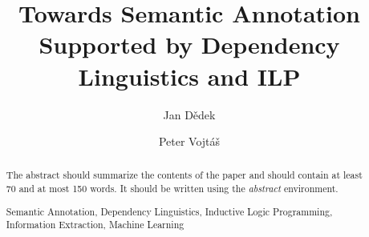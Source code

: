 \documentclass[runningheads,a4paper]{llncs}
\newcommand{\keywords}[1]{\par\addvspace\baselineskip
\noindent\keywordname\enspace\ignorespaces#1}
\begin{document}
\mainmatter  %

\title{Towards Semantic Annotation Supported by Dependency Linguistics and ILP}


%
%
\author{Jan D\v{e}dek
\and Peter Vojt\'{a}\v{s}}
%


%
%

\maketitle


\begin{abstract}
The abstract should summarize the contents of the paper and should
contain at least 70 and at most 150 words. It should be written using the
\emph{abstract} environment.
\keywords{Semantic Annotation, Dependency Linguistics, Inductive Logic Programming, Information Extraction, Machine Learning}
\end{abstract}
\end{document}
